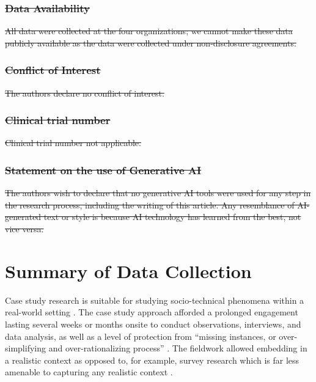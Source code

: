 \documentclass[smallextended]{svjour3}        %
\providecommand{\DIFdeltex}[1]{{\protect\color{red}\sout{#1}}} %
\providecommand{\DIFaddbegin}{} %
\providecommand{\DIFaddend}{} %
\providecommand{\DIFdelbegin}{} %
\providecommand{\DIFdelend}{} %
\providecommand{\DIFdel}[1]{\texorpdfstring{\DIFdeltex{#1}}{}} %
\newcommand{\DIFscaledelfig}{0.5}
\newlength{\DIFdelgraphicswidth} %
\newlength{\DIFdelgraphicsheight} %
\newcommand{\DIFaddincludegraphics}[2][]{{\color{blue}\fbox{\DIFOincludegraphics[#1]{#2}}}} %
\newcommand{\DIFdelincludegraphics}[2][]{%
\sbox{\DIFdelgraphicsbox}{\DIFOincludegraphics[#1]{#2}}%
\settoboxwidth{\DIFdelgraphicswidth}{\DIFdelgraphicsbox} %
\settoboxtotalheight{\DIFdelgraphicsheight}{\DIFdelgraphicsbox} %
\scalebox{\DIFscaledelfig}{%
\parbox[b]{\DIFdelgraphicswidth}{\usebox{\DIFdelgraphicsbox}\\[-\baselineskip] \rule{\DIFdelgraphicswidth}{0em}}\llap{\resizebox{\DIFdelgraphicswidth}{\DIFdelgraphicsheight}{%
\setlength{\unitlength}{\DIFdelgraphicswidth}%
\begin{picture}(1,1)%
\thicklines\linethickness{2pt} %
{\color[rgb]{1,0,0}\put(0,0){\framebox(1,1){}}}%
{\color[rgb]{1,0,0}\put(0,0){\line( 1,1){1}}}%
{\color[rgb]{1,0,0}\put(0,1){\line(1,-1){1}}}%
\end{picture}%
}\hspace*{3pt}}} %
} %
\DeclareRobustCommand{\DIFaddbegin}{\DIFOaddbegin \let\includegraphics\DIFaddincludegraphics} %
\DeclareRobustCommand{\DIFaddend}{\DIFOaddend \let\includegraphics\DIFOincludegraphics} %
\DeclareRobustCommand{\DIFdelbegin}{\DIFOdelbegin \let\includegraphics\DIFdelincludegraphics} %
\DeclareRobustCommand{\DIFdelend}{\DIFOaddend \let\includegraphics\DIFOincludegraphics} %
\begin{document}
\subsubsection*{\DIFdel{Data Availability}}
\DIFdel{All data were collected at the four organizations; we cannot make these data publicly available as the data were collected under non-disclosure agreements. 
}%

\subsubsection*{\DIFdel{Conflict of Interest}}
\DIFdel{The authors declare no conflict of interest.
}%

\subsubsection*{\DIFdel{Clinical trial number}}
\DIFdel{Clinical trial number not applicable. 
}%

\subsubsection*{\DIFdel{Statement on the use of Generative AI}}
\DIFdel{The authors wish to declare that no generative AI tools were used for any step in the research process, including the writing of this article. Any resemblance of AI-generated text or style is because AI technology has learned from the best, not vice versa.
}%

\DIFdelend \appendix
\DIFdelbegin %

\DIFdelend \DIFaddbegin \normalsize
\DIFaddend \section{Summary of Data Collection}
\label{app:datacollection}

Case study research is suitable for studying socio-technical phenomena within a real-world setting  \cite[p. 1]{yin_case_2002}.
The case study approach afforded a prolonged engagement lasting several weeks or months onsite to conduct observations, interviews, and data analysis, as well as a level of protection from ``missing instances, or over-simplifying and over-rationalizing process'' \citep{ralph_tse_theories}. The fieldwork allowed embedding in a realistic context as opposed to, for example, survey research which is far less amenable to capturing any realistic context \citep{stol2018abc}.
\end{document}
